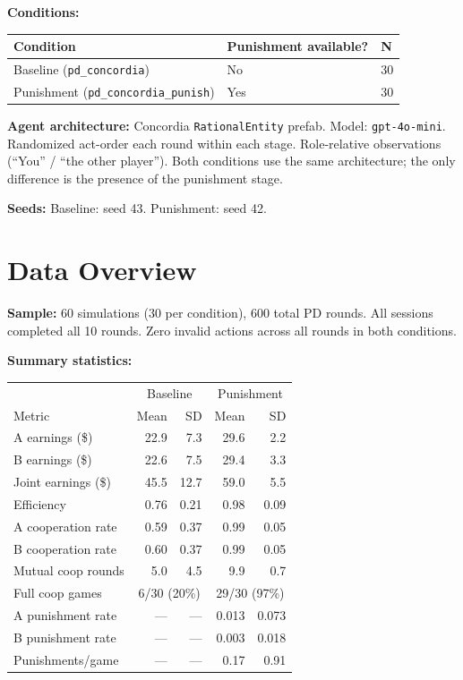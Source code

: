 \documentclass[11pt]{article}
\begin{document}
\textbf{Conditions:}
\begin{center}
\begin{tabular}{lll}
\toprule
Condition & Punishment available? & N \\
\midrule
Baseline (\texttt{pd\_concordia}) & No & 30 \\
Punishment (\texttt{pd\_concordia\_punish}) & Yes & 30 \\
\bottomrule
\end{tabular}
\end{center}

\textbf{Agent architecture:} Concordia \texttt{RationalEntity} prefab. Model: \texttt{gpt-4o-mini}. Randomized act-order each round within each stage. Role-relative observations (``You'' / ``the other player''). Both conditions use the same architecture; the only difference is the presence of the punishment stage.

\textbf{Seeds:} Baseline: seed 43. Punishment: seed 42.

\section*{Data Overview}

\textbf{Sample:} 60 simulations (30 per condition), 600 total PD rounds. All sessions completed all 10 rounds. Zero invalid actions across all rounds in both conditions.

\textbf{Summary statistics:}

\begin{center}
\begin{tabular}{l rr rr}
\toprule
 & \multicolumn{2}{c}{Baseline} & \multicolumn{2}{c}{Punishment} \\
Metric & Mean & SD & Mean & SD \\
\midrule
A earnings (\$) & 22.9 & 7.3 & 29.6 & 2.2 \\
B earnings (\$) & 22.6 & 7.5 & 29.4 & 3.3 \\
Joint earnings (\$) & 45.5 & 12.7 & 59.0 & 5.5 \\
Efficiency & 0.76 & 0.21 & 0.98 & 0.09 \\
A cooperation rate & 0.59 & 0.37 & 0.99 & 0.05 \\
B cooperation rate & 0.60 & 0.37 & 0.99 & 0.05 \\
Mutual coop rounds & 5.0 & 4.5 & 9.9 & 0.7 \\
Full coop games & \multicolumn{2}{c}{6/30 (20\%)} & \multicolumn{2}{c}{29/30 (97\%)} \\
\midrule
A punishment rate & --- & --- & 0.013 & 0.073 \\
B punishment rate & --- & --- & 0.003 & 0.018 \\
Punishments/game & --- & --- & 0.17 & 0.91 \\
\bottomrule
\end{tabular}
\end{center}
\end{document}
